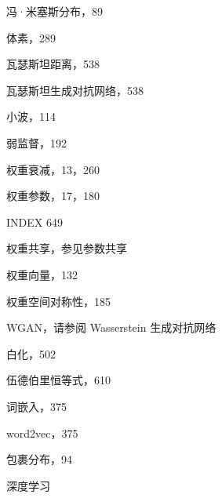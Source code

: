 \documentclass[10pt]{article}
\begin{document}
冯·米塞斯分布，89

体素，289

瓦瑟斯坦距离，538

瓦瑟斯坦生成对抗网络，538

小波，114

弱监督，192

权重衰减，13，260

权重参数，17，180

INDEX 649

权重共享，参见参数共享

权重向量，132

权重空间对称性，185

WGAN，请参阅 Wasserstein 生成对抗网络

白化，502

伍德伯里恒等式，610

词嵌入，375

word2vec，375

包裹分布，94

深度学习
\end{document}
